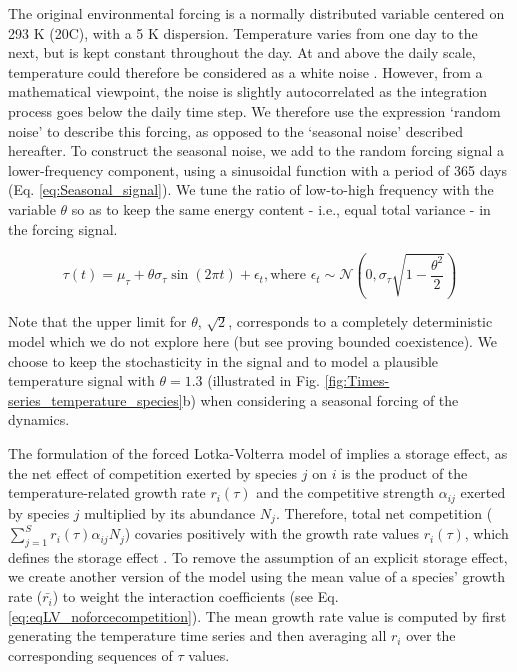\documentclass[a4paper,12pt]{article}
\begin{document}
The original environmental forcing is a normally distributed variable
centered on 293 K (20\textdegree C), with a 5 K dispersion. Temperature varies
from one day to the next, but is kept constant throughout the day.
At and above the daily scale, temperature could therefore be considered
as a white noise \citep{vasseur_color_2004}. However, from a mathematical
viewpoint, the noise is slightly autocorrelated as the integration
process goes below the daily time step. We therefore use the expression
`random noise' to describe this forcing, as opposed to the `seasonal
noise' described hereafter. To construct the seasonal noise, we add
to the random forcing signal a lower-frequency component, using a
sinusoidal function with a period of 365 days (Eq. \ref{eq:Seasonal_signal}).
We tune the ratio of low-to-high frequency with the variable $\theta$
so as to keep the same energy content - i.e., equal total variance
- in the forcing signal.

\begin{equation}
\tau(t)=\mu_{\tau}+\theta\sigma_{\tau}\sin\left(2\pi t\right)+\epsilon_{t},\text{where }\epsilon_{t}\sim\mathcal{N}\left(0,\sigma_{\tau}\sqrt{1-\frac{\theta^{2}}{2}}\right)\label{eq:Seasonal_signal}
\end{equation}

Note that the upper limit for $\theta$, $\sqrt{2}$, corresponds
to a completely deterministic model which we do not explore here (but
see \citet{zhao1991qualitative} proving bounded coexistence). We
choose to keep the stochasticity in the signal and to model a plausible
temperature signal with $\theta=1.3$ (illustrated in Fig. \ref{fig:Times-series_temperature_species}b)
when considering a seasonal forcing of the dynamics.

The formulation of the forced Lotka-Volterra model of \citet{scranton_coexistence_2016}
implies a storage effect, as the net effect of competition exerted
by species $j$ on $i$ is the product of the temperature-related
growth rate $r_{i}(\tau)$ and the competitive strength $\alpha_{ij}$
exerted by species $j$ multiplied by its abundance $N_{j}$. Therefore,
total net competition ($\sum_{j=1}^{S}r_{i}(\tau)\alpha_{ij}N_{j}$)
covaries positively with the growth rate values $r_{i}(\tau)$, which
defines the storage effect \citep{chesson_multispecies_1994,fox_intermediate_2013,ellner_how_2016}.
To remove the assumption of an explicit storage effect, we create
another version of the model using the mean value of a species' growth
rate ($\bar{r_{i}}$) to weight the interaction coefficients (see
Eq. \ref{eq:eqLV_noforcecompetition}). The mean growth rate value
is computed by first generating the temperature time series and then
averaging all $r_{i}$ over the corresponding sequences of $\tau$
values.
\end{document}
